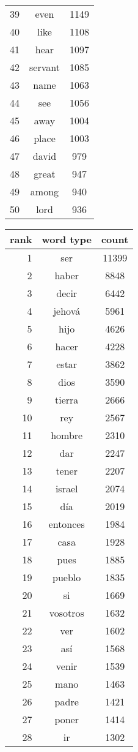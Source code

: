\begin{figure*}
\begin{tiny}
\begin{centering}
\begin{tabular}{|r|c|c|}
39 & even & 1149 \\
40 & like & 1108 \\
41 & hear & 1097 \\
42 & servant & 1085 \\
43 & name & 1063 \\
44 & see & 1056 \\
45 & away & 1004 \\
46 & place & 1003 \\
47 & david & 979 \\
48 & great & 947 \\
49 & among & 940 \\
50 & lord & 936 \\
    \hline
  \end{tabular}
  \quad
  \begin{tabular}{|r|c|c|}
    \hline
    rank & word type & count \\
    \hline
1 & ser & 11399 \\
2 & haber & 8848 \\
3 & decir & 6442 \\
4 & jehová & 5961 \\
5 & hijo & 4626 \\
6 & hacer & 4228 \\
7 & estar & 3862 \\
8 & dios & 3590 \\
9 & tierra & 2666 \\
10 & rey & 2567 \\
11 & hombre & 2310 \\
12 & dar & 2247 \\
13 & tener & 2207 \\
14 & israel & 2074 \\
15 & día & 2019 \\
16 & entonces & 1984 \\
17 & casa & 1928 \\
18 & pues & 1885 \\
19 & pueblo & 1835 \\
20 & si & 1669 \\
21 & vosotros & 1632 \\
22 & ver & 1602 \\
23 & así & 1568 \\
24 & venir & 1539 \\
25 & mano & 1463 \\
26 & padre & 1421 \\
27 & poner & 1414 \\
28 & ir & 1302 \\

\end{tabular}
\end{centering}
\end{tiny}
\end{figure*}
